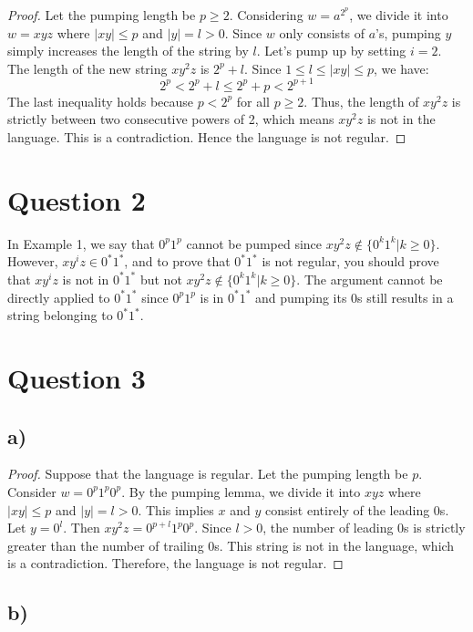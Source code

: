 \documentclass[a4paper, UTF-8]{article}
\theoremstyle{plain}
\begin{document}
\begin{proof} 
Let the pumping length be $p \geq 2$.
Considering $w = a^{2^p}$, we divide it into $w = xyz$ where $|xy| \leq p$ and $|y| = l > 0$.
Since $w$ only consists of $a$'s, pumping $y$ simply increases the length of the string by $l$. Let's pump up by setting $i=2$.
The length of the new string $xy^2z$ is $2^p + l$.
Since $1 \leq l \leq |xy| \leq p$, we have:
$$2^p < 2^p + l \leq 2^p + p < 2^{p+1}$$
The last inequality holds because $p < 2^p$ for all $p \geq 2$. 
Thus, the length of $xy^2z$ is strictly between two consecutive powers of 2, which means $xy^2z$ is not in the language. This is a contradiction. Hence the language is not regular.
\end{proof}

\section{Question 2} 

In Example 1, we say that $0^p 1^p$ cannot be pumped since $xy^2 z \notin \{0^k1^k|k \geq 0\}$.
However, $xy^iz \in 0^*1^*$, and to prove that $0^*1^*$ is not regular, you should prove that $xy^iz$ is not in $0^*1^*$ but not $xy^2z \notin \{0^k1^k|k \geq 0\}$.
The argument cannot be directly applied to $0^*1^*$ since $0^p 1^p$ is in $0^*1^*$ and pumping its $0$s still results in a string belonging to $0^*1^*$.

\section{Question 3} 

\subsection{a)} 

\begin{proof} 
Suppose that the language is regular. Let the pumping length be $p$.
Consider $w = 0^p1^p0^p$. By the pumping lemma, we divide it into $xyz$ where $|xy| \leq p$ and $|y| = l > 0$.
This implies $x$ and $y$ consist entirely of the leading $0$s. Let $y = 0^l$.
Then $xy^2z = 0^{p + l}1^p0^p$. Since $l > 0$, the number of leading $0$s is strictly greater than the number of trailing $0$s.
This string is not in the language, which is a contradiction. Therefore, the language is not regular.
\end{proof} 

\subsection{b)} 
\end{document}
